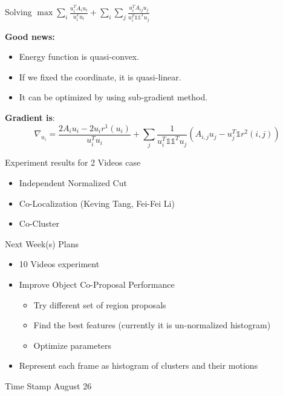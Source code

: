 \begin{frame}{\vspace{-8mm}\\ Solving $\max \sum_{i} \frac{u_i^TA_iu_i}{u_i^Tu_i} + \sum_{i}\sum_{j} \frac{u_i^TA_{ij}u_j}{u_i^T \mathds{1} \mathds{1}^Tu_j}$}

{\bf Good news:}
\begin{itemize}
\item Energy function is quasi-convex.
\item If we fixed the coordinate, it is quasi-linear.
\item It can be optimized by using sub-gradient method.
\end{itemize}

{\bf Gradient is}: \\
\[
\nabla_{u_i} = \frac{2A_i u_i -2u_ir^1(u_i)}{u_i^Tu_i} + \sum_j \frac{1}{u_i^T \mathds{1} \mathds{1}^T u_j} \left( A_{i,j}u_j - u_j^T \mathds{1} r^2(i,j) \right)
\]

\end{frame}

\begin{frame}{Experiment results for 2 Videos case}

\begin{itemize}
\item Independent Normalized Cut
\item Co-Localization (Keving Tang, Fei-Fei Li)
\item Co-Cluster
\end{itemize}
\end{frame}

\begin{frame}{Next Week(s) Plans}
\begin{itemize}
\item 10 Videos experiment
\item Improve Object Co-Proposal Performance
\begin{itemize}
\item Try different set of region proposals
\item Find the best features (currently it is un-normalized histogram)
\item Optimize parameters
\end{itemize}
\item Represent each frame as histogram of clusters and their motions
\end{itemize}
\end{frame}

\begin{frame}{Time Stamp}
August 26
\end{frame}

